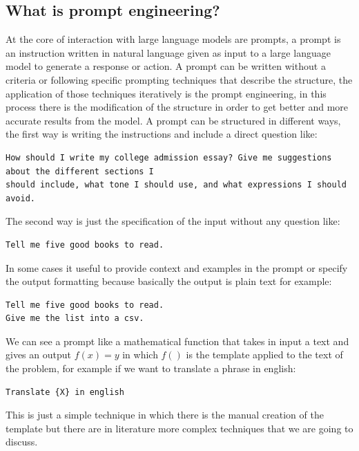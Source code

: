 \subsection{What is prompt engineering?}
At the core of interaction with large language models are prompts, a prompt is an instruction written in natural language given as input to a large language model to generate a response or action.\cite{llm_prompt}
A prompt can be written without a criteria or following specific prompting techniques that describe the structure, the application of those techniques iteratively is the prompt engineering\cite{schulhoff2024prompt}, in this process there is the modification of the structure in order to get better and more accurate results from the model. A prompt can be structured in different ways, the first way is writing the instructions and include a direct question like:
\begin{lstlisting}
How should I write my college admission essay? Give me suggestions about the different sections I
should include, what tone I should use, and what expressions I should avoid.   
\end{lstlisting}

The second way is just the specification of the input without any question like:
\begin{lstlisting}
Tell me five good books to read. 
\end{lstlisting}
In some cases it useful to provide context and examples in the prompt or specify the output formatting because basically the output is plain text for example:
\begin{lstlisting}
Tell me five good books to read.
Give me the list into a csv.
\end{lstlisting}
We can see a prompt like a mathematical function that takes in input a text and gives an output $ f(x) = y$ in which $f()$ is the template applied to the text of the problem, for example if we want to translate a phrase in english: 
\begin{lstlisting}
Translate {X} in english
\end{lstlisting}
This is just a simple technique in which there is the manual creation of the template but there are in literature more complex techniques that we are going to discuss.

